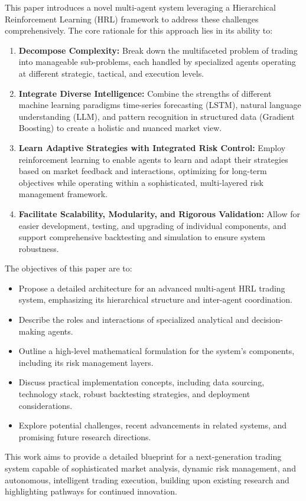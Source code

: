 \documentclass[11pt]{article}
\begin{document}
This paper introduces a novel multi-agent system leveraging a Hierarchical Reinforcement Learning (HRL) framework to address these challenges comprehensively. The core rationale for this approach lies in its ability to:
\begin{enumerate}
\item  \textbf{Decompose Complexity:} Break down the multifaceted problem of trading into manageable sub-problems, each handled by specialized agents operating at different strategic, tactical, and execution levels.
\item  \textbf{Integrate Diverse Intelligence:} Combine the strengths of different machine learning paradigms  time-series forecasting (LSTM), natural language understanding (LLM), and pattern recognition in structured data (Gradient Boosting)  to create a holistic and nuanced market view.
\item  \textbf{Learn Adaptive Strategies with Integrated Risk Control:} Employ reinforcement learning to enable agents to learn and adapt their strategies based on market feedback and interactions, optimizing for long-term objectives while operating within a sophisticated, multi-layered risk management framework.
\item  \textbf{Facilitate Scalability, Modularity, and Rigorous Validation:} Allow for easier development, testing, and upgrading of individual components, and support comprehensive backtesting and simulation to ensure system robustness.

\end{enumerate}
The objectives of this paper are to:
\begin{itemize}
\item   Propose a detailed architecture for an advanced multi-agent HRL trading system, emphasizing its hierarchical structure and inter-agent coordination.
\item   Describe the roles and interactions of specialized analytical and decision-making agents.
\item   Outline a high-level mathematical formulation for the system's components, including its risk management layers.
\item   Discuss practical implementation concepts, including data sourcing, technology stack, robust backtesting strategies, and deployment considerations.
\item   Explore potential challenges, recent advancements in related systems, and promising future research directions.

\end{itemize}
This work aims to provide a detailed blueprint for a next-generation trading system capable of sophisticated market analysis, dynamic risk management, and autonomous, intelligent trading execution, building upon existing research and highlighting pathways for continued innovation.
\end{document}
